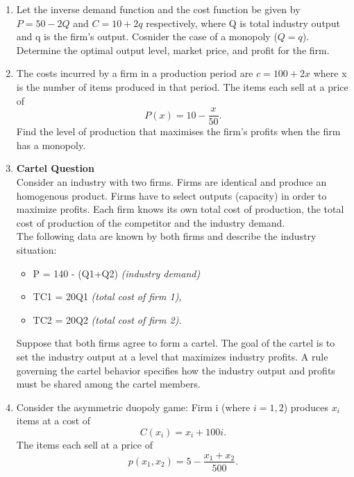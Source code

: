 \documentclass[a4paper,12pt]{article}
\begin{document}
\begin{enumerate}

\item %
Let the inverse demand function and the cost function be given by
$P = 50 − 2Q$ and $C = 10 + 2q$
respectively, where Q is total industry output and q is the firm’s output. 
Cosnider the case of a monopoly ($Q=q$). Determine the optimal output level, market price, and profit for the firm.
\item %
The costs incurred by a firm in a production period are
$c = 100 + 2x$
where x is the number of items produced in that period. The items each sell
at a price of
\[P(x) = 10 - \frac{x}{50}. \]
Find the level of production that maximises the firm’s profits
when the firm has a monopoly.

\item \textbf{Cartel Question}\\
Consider an industry with two firms. Firms are identical and produce an
homogenous product. Firms have to select outputs (capacity) in order to maximize
profits. Each firm knows its own total cost of production, the total cost of production of
the competitor and the industry demand.
\\
The following data are known by both firms and describe the industry
situation:
\begin{itemize}
\item P = 140 - (Q1+Q2) \textit{(industry demand)}
\item TC1 = 20Q1 \textit{(total cost of firm 1),}
\item TC2 = 20Q2 \textit{(total cost of firm 2).}
\end{itemize}
Suppose that both firms agree to form a cartel. The goal of the cartel is to set the
industry output at a level that maximizes industry profits. A rule governing the cartel
behavior specifies how the industry output and profits must be shared among the cartel
members.


\item Consider the asymmetric duopoly game: Firm i (where $i = 1, 2$) produces $x_i$
        items
        at a cost of
        \[C(x_i) = x_i + 100i.\]
        The items each sell at a price of
        \[p(x_1, x_2) = 5 - \frac{x_1 + x_2}{500}.\]


\end{enumerate}
\end{document}
